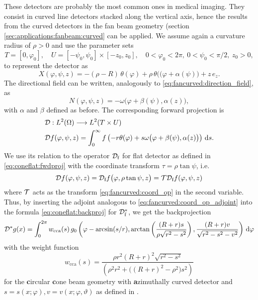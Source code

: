 \documentclass{amsart}
\renewcommand*{\phi}{\varphi}
\begin{document}
These detectors are probably the most common ones in medical imaging. They consist in curved line detectors stacked along the vertical 
axis, hence the results from the curved detectors in the fan beam geometry (section \ref{sec:applications:fanbeam:curved} can be applied. 
We assume again a curvature radius of $\rho > 0$ and use the parameter sets
%
\begin{equation}
 \label{eq:conestack:params}
 T = [0, \phi_0],\quad U = [-\psi_0, \psi_0] \times [-z_0, z_0], \quad 0 < \phi_0 < 2\pi,\ 0 < \psi_0 < \pi/2,\ z_0 > 0,
\end{equation}
%
to represent the detector as
%
\begin{equation}
 \label{eq:conestack:detector_parametr}
 X(\phi, \psi, z) = -(\rho - R)\, \theta(\phi) + \rho\, \theta\big((\phi + \alpha(\psi)\big) + z\, e_z.
\end{equation}
%
The directional field can be written, analogously to \eqref{eq:fancurved:direction_field}, as
%
\begin{equation}
 \label{eq:conestack:dirfield}
 N(\phi, \psi, z) = -\omega\big( \phi + \beta(\psi), \alpha(z) \big),
\end{equation} 
%
with $\alpha$ and $\beta$ defined as before. The corresponding forward projection is
%
\begin{align}
 &\OPD: L^2(\Omega) \Lto L^2(T \times U) \notag \\
 &\OPD f(\phi, \psi, z) = \int_0^\infty f\left( -r\theta(\phi) + s \omega\big( \phi + \beta(\psi), \alpha(z) \big) \right)\, \D s.
\end{align}
%
We use its relation to the operator ${\mathcal{D}}_{\text{f}}$ for flat detector as defined in \eqref{eq:coneflat:fwdproj} with the coordinate 
transform $\tau = \rho\tan\psi$, i.e. 
%
\begin{equation*}
 \OPD f(\phi, \psi, z) = \OPD_{\text{f}} f\big(\phi, \rho\tan\psi, z\big) = \OPT \OPD_{\text{f}} f(\phi, \psi, z)
\end{equation*}
%
where ${\mathcal{T}}$ acts as the transform \eqref{eq:fancurved:coord_op} in the second variable. Thus, by inserting the adjoint analogous 
to \eqref{eq:fancurved:coord_op_adjoint} into the formula \eqref{eq:coneflat:backproj} for ${\mathcal{D}}_{\text{f}}^*$, we get the backprojection
%
\begin{equation}
 \label{eq:conestack:backproj}
 \OPD^* g(x) = \int_0^{2\pi} w_{\text{cca}}(s)\, g_0 \left( \phi - \arcsin(s/r), \arctan\left( \frac{(R+r)s}{\rho\sqrt{r^2-s^2}} \right), 
 \frac{(R+r)v}{\sqrt{r^2-s^2-v^2}} \right)\, \D\phi
\end{equation} 
%
with the weight function
%
\begin{equation}
 \label{eq:conestack:backproj_weight}
 w_{\text{cca}}(s) = \frac{\rho r^2(R+r)^2\sqrt{r^2-s^2}}{\left( \rho^2 r^2 + \big((R+r)^2 - \rho^2\big) s^2 \right)}
\end{equation}
%
for the \textbf{c}ircular \textbf{c}one beam geometry with \textbf{a}zimuthally curved detector and $s=s(x;\phi), v=v(x;\phi,\vartheta)$ as 
defined in .
\end{document}
